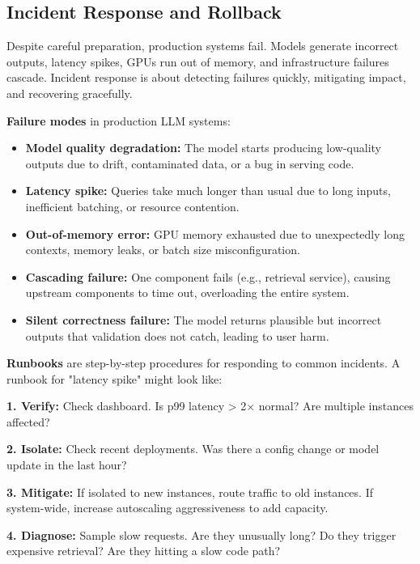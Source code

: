 \vspace{1.5em}


\subsection{Incident Response and Rollback}

Despite careful preparation, production systems fail. Models generate incorrect outputs, latency spikes, GPUs run out of memory, and infrastructure failures cascade. Incident response is about detecting failures quickly, mitigating impact, and recovering gracefully.

\textbf{Failure modes} in production LLM systems:

\begin{itemize}
\item \textbf{Model quality degradation:} The model starts producing low-quality outputs due to drift, contaminated data, or a bug in serving code.
\item \textbf{Latency spike:} Queries take much longer than usual due to long inputs, inefficient batching, or resource contention.
\item \textbf{Out-of-memory error:} GPU memory exhausted due to unexpectedly long contexts, memory leaks, or batch size misconfiguration.
\item \textbf{Cascading failure:} One component fails (e.g., retrieval service), causing upstream components to time out, overloading the entire system.
\item \textbf{Silent correctness failure:} The model returns plausible but incorrect outputs that validation does not catch, leading to user harm.
\end{itemize}

\textbf{Runbooks} are step-by-step procedures for responding to common incidents. A runbook for "latency spike" might look like:

\vspace{0.5em}

\textbf{1. Verify:} Check dashboard. Is p99 latency > 2$\times$ normal? Are multiple instances affected?

\textbf{2. Isolate:} Check recent deployments. Was there a config change or model update in the last hour?

\textbf{3. Mitigate:} If isolated to new instances, route traffic to old instances. If system-wide, increase autoscaling aggressiveness to add capacity.

\textbf{4. Diagnose:} Sample slow requests. Are they unusually long? Do they trigger expensive retrieval? Are they hitting a slow code path?

